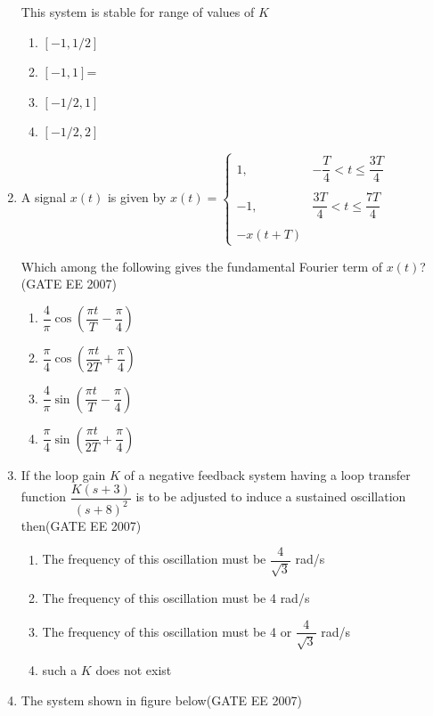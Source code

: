 \documentclass[a4paper,10pt]{exam}
\theoremstyle{remark}
\begin{document}
\begin{enumerate}
This system is stable for range of values of $K$

\begin{multicols}{4}
\begin{enumerate}
\item  $[-1, 1/2]$
\item  $[-1, 1]$=
\item  $[-1/2, 1]$
\item  $[-1/2, 2]$
\end{enumerate}
\end{multicols}

\item A signal $x(t)$ is given by
$
x(t) = \begin{cases} 
1, & -\dfrac{T}{4} < t \leq \dfrac{3T}{4} \\\\ 
-1, & \dfrac{3T}{4} < t \leq \dfrac{7T}{4} \\\\ 
-x(t+T)
\end{cases}
$

Which among the following gives the fundamental Fourier term of $x(t)$?\hfill{(GATE EE 2007)} 

\begin{multicols}{2}
\begin{enumerate}

\item  $\dfrac{4}{\pi} \cos\left(\dfrac{\pi t}{T} - \dfrac{\pi}{4}\right)$

\item  $\dfrac{\pi}{4} \cos\left(\dfrac{\pi t}{2T} + \dfrac{\pi}{4}\right)$

\item  $\dfrac{4}{\pi} \sin\left(\dfrac{\pi t}{T} - \dfrac{\pi}{4}\right)$

\item  $\dfrac{\pi}{4} \sin\left(\dfrac{\pi t}{2T} + \dfrac{\pi}{4}\right)$
\end{enumerate}
\end{multicols}



\item  If the loop gain $K$ of a negative feedback system having a loop transfer function $\dfrac{K(s+3)}{(s+8)^2}$ is to be adjusted to induce a sustained oscillation then\hfill{(GATE EE 2007)} 

\begin{enumerate}
    \item The frequency of this oscillation must be $\dfrac{4}{\sqrt{3}}$ rad/s
    \item The frequency of this oscillation must be 4 rad/s
    \item The frequency of this oscillation must be 4 or $\dfrac{4}{\sqrt{3}}$ rad/s
    \item such a $K$ does not exist
\end{enumerate}
\newpage
\item   The system shown in figure below\hfill{(GATE EE 2007)} 


\end{enumerate}
\end{document}
